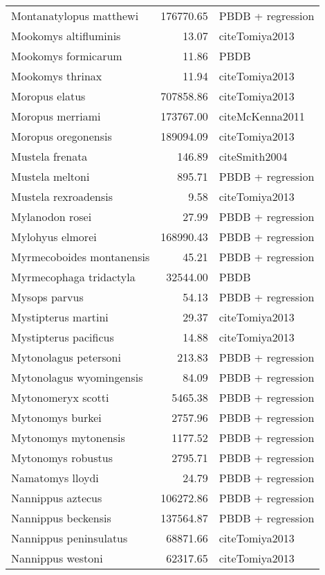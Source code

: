 \begin{table}[ht]
\begin{tabular}{lrl}
  Montanatylopus matthewi & 176770.65 & PBDB + regression \\ 
  Mookomys altifluminis & 13.07 & cite{Tomiya2013} \\ 
  Mookomys formicarum & 11.86 & PBDB \\ 
  Mookomys thrinax & 11.94 & cite{Tomiya2013} \\ 
  Moropus elatus & 707858.86 & cite{Tomiya2013} \\ 
  Moropus merriami & 173767.00 & cite{McKenna2011} \\ 
  Moropus oregonensis & 189094.09 & cite{Tomiya2013} \\ 
  Mustela frenata & 146.89 & cite{Smith2004} \\ 
  Mustela meltoni & 895.71 & PBDB + regression \\ 
  Mustela rexroadensis & 9.58 & cite{Tomiya2013} \\ 
  Mylanodon rosei & 27.99 & PBDB + regression \\ 
  Mylohyus elmorei & 168990.43 & PBDB + regression \\ 
  Myrmecoboides montanensis & 45.21 & PBDB + regression \\ 
  Myrmecophaga tridactyla & 32544.00 & PBDB \\ 
  Mysops parvus & 54.13 & PBDB + regression \\ 
  Mystipterus martini & 29.37 & cite{Tomiya2013} \\ 
  Mystipterus pacificus & 14.88 & cite{Tomiya2013} \\ 
  Mytonolagus petersoni & 213.83 & PBDB + regression \\ 
  Mytonolagus wyomingensis & 84.09 & PBDB + regression \\ 
  Mytonomeryx scotti & 5465.38 & PBDB + regression \\ 
  Mytonomys burkei & 2757.96 & PBDB + regression \\ 
  Mytonomys mytonensis & 1177.52 & PBDB + regression \\ 
  Mytonomys robustus & 2795.71 & PBDB + regression \\ 
  Namatomys lloydi & 24.79 & PBDB + regression \\ 
  Nannippus aztecus & 106272.86 & PBDB + regression \\ 
  Nannippus beckensis & 137564.87 & PBDB + regression \\ 
  Nannippus peninsulatus & 68871.66 & cite{Tomiya2013} \\ 
  Nannippus westoni & 62317.65 & cite{Tomiya2013} \\ 

\end{tabular}
\end{table}
